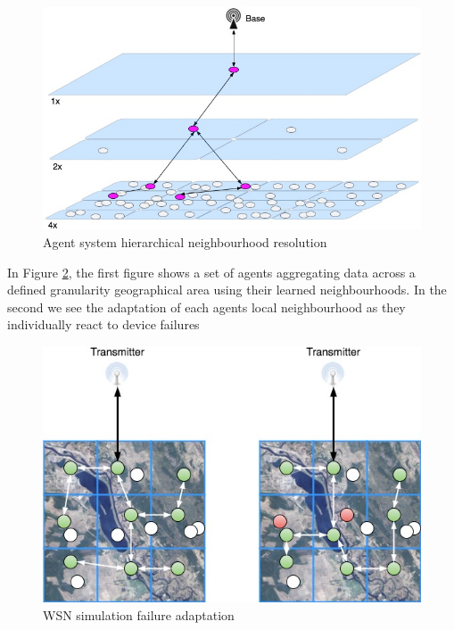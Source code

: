 \begin{figure}[]
	\centering
	\includegraphics[width=0.5\linewidth]{WSN_hierarchical_resolution}
	\caption{Agent system hierarchical neighbourhood resolution}
	\label{fig:wsnhierarchicalresolution}
\end{figure}
In Figure \ref{fig:wsnsimulationmapfailureadaptation}, the first figure shows a set of agents aggregating data across a defined granularity geographical area using their learned neighbourhoods. In the second we see the adaptation of each agents local neighbourhood as they individually react to device failures
\begin{figure}[]
	\centering
	\includegraphics[width=0.5\linewidth]{WSN_simulation_map_failure_adaptation}
	\caption{WSN simulation failure adaptation}
	\label{fig:wsnsimulationmapfailureadaptation}
\end{figure}

